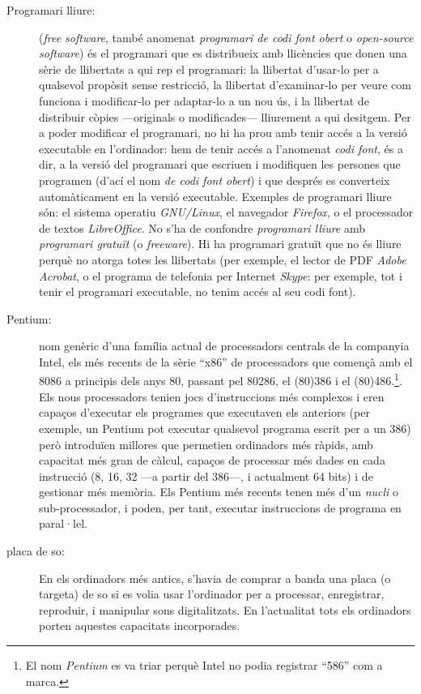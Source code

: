 \begin{description}
\item[Programari lliure:] (\emph{free software}, també anomenat
  \emph{programari de codi font obert} o \emph{open-source software})
  és el programari que es distribueix amb llicències que donen una
  sèrie de llibertats a qui rep el programari: la llibertat d'usar-lo
  per a qualsevol propòsit sense restricció, la llibertat
  d'examinar-lo per veure com funciona i modificar-lo per adaptar-lo a
  un nou ús, i la llibertat de distribuir còpies ---originals o
  modificades--- lliurement a qui desitgem. Per a poder modificar el
  programari, no hi ha prou amb tenir accés a la versió executable en
  l'ordinador: hem de tenir accés a l'anomenat \emph{codi font}, és a
  dir, a la versió del programari que escriuen i modifiquen les
  persones que programen (d'ací el nom \emph{de codi font obert}) i
  que després es converteix automàticament en la versió
  executable. Exemples de programari lliure són: el sistema operatiu
  \emph{GNU/Linux}, el navegador \emph{Firefox}, o el processador de
  textos \emph{LibreOffice}. No s'ha de confondre \emph{programari
    lliure} amb \emph{programari gratuït} (o \emph{freeware}). Hi ha
  programari gratuït que no és lliure perquè no atorga totes les
  llibertats (per exemple, el lector de PDF \emph{Adobe Acrobat}, o el
  programa de telefonia per Internet \emph{Skype}: per exemple, tot i
  tenir el programari executable, no tenim accés al seu codi font).
  
\item[Pentium:] nom genèric d'una família actual de processadors
  centrals de la companyia Intel, els més recents de la sèrie ``x86''
  de processadors que començà amb el 8086 a principis dels anys 80,
  passant pel 80286, el (80)386 i el (80)486.\footnote{El nom
    \emph{Pentium} es va triar perquè Intel no podia registrar ``586''
    com a marca.}. Els nous processadors tenien jocs d'instruccions
  més complexos i eren capaços d'executar els programes que executaven
  els anteriors (per exemple, un Pentium pot executar qualsevol
  programa escrit per a un 386) però introduïen millores que permetien
  ordinadors més ràpids, amb capacitat més gran de càlcul, capaços de
  processar més dades en cada instrucció (8, 16, 32 ---a partir del
  386---, i actualment 64 bits) i de gestionar més memòria. Els
  Pentium més recents tenen més d'un \emph{nucli} o sub-processador, i
  poden, per tant, executar instruccions de programa en paral·lel.

\item[placa de so:] En els ordinadors més antics, s'havia de comprar a
  banda una placa (o targeta) de so si es volia usar l'ordinador per a
  processar, enregistrar, reproduir, i manipular sons
  digitalitzats. En l'actualitat tots els ordinadors porten aquestes
  capacitats incorporades.


\end{description}
